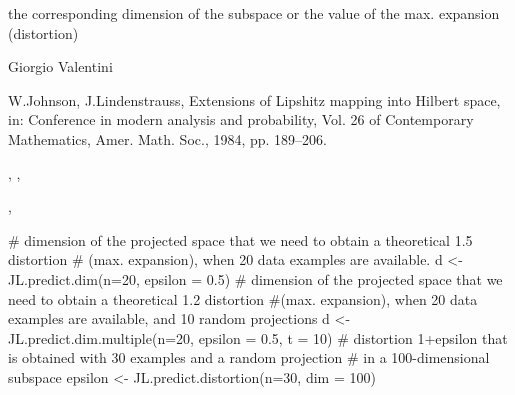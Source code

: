 \documentclass{article}
\begin{document}
\begin{Value}
the corresponding dimension of the subspace or the \eqn{\epsilon}{} value of the  max. expansion
(distortion)
\end{Value}
\begin{Author}\relax
Giorgio Valentini 
\end{Author}
\begin{References}\relax
W.Johnson, J.Lindenstrauss, Extensions of Lipshitz mapping into Hilbert
space, in: Conference in modern analysis and probability, Vol. 26 of
Contemporary Mathematics, Amer. Math. Soc., 1984, pp. 189--206.
\end{References}
\begin{SeeAlso}\relax
{}, ,

,  
\end{SeeAlso}
\begin{Examples}
\begin{ExampleCode}
# dimension of the projected space that we need to obtain a theoretical 1.5 distortion 
# (max. expansion), when 20 data examples are available.
d <- JL.predict.dim(n=20, epsilon = 0.5)
# dimension of the projected space that we need to obtain a theoretical 1.2 distortion 
#(max. expansion), when 20 data examples are available, and 10 random projections
d <- JL.predict.dim.multiple(n=20, epsilon = 0.5, t = 10)
# distortion 1+epsilon that is obtained with 30 examples and a random projection 
# in a 100-dimensional subspace
epsilon <- JL.predict.distortion(n=30, dim = 100)
\end{ExampleCode}
\end{Examples}
\end{document}
